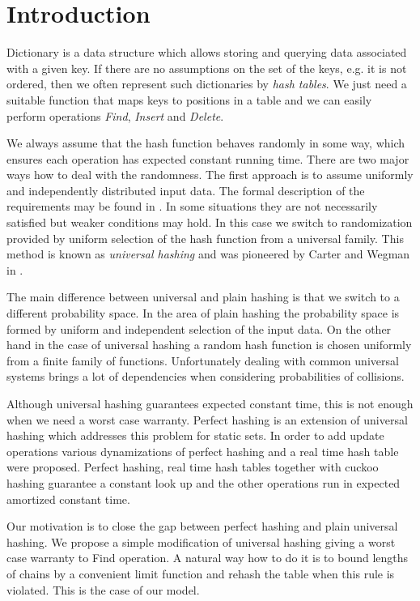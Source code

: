\section{Introduction}
Dictionary is a data structure which allows storing and querying data associated with a given key. If there are no assumptions on the set of the keys, e.g. it is not ordered, then we often represent such dictionaries by \emph{hash tables}. We just need a suitable function that maps keys to positions in a table and we can easily perform operations \emph{Find}, \emph{Insert} and \emph{Delete}. 

We always assume that the hash function behaves randomly in some way, which ensures each operation has expected constant running time. There are two major ways how to deal with the randomness. The first approach is to assume uniformly and independently distributed input data. The formal description of the requirements may be found in \cite{DBLP:books/sp/Mehlhorn84}. In some situations they are not necessarily satisfied but weaker conditions may hold. In this case we switch to randomization provided by uniform selection of the hash function from a universal family. This method is known as \emph{universal hashing} and was pioneered by Carter and Wegman in \cite{DBLP:journals/jcss/CarterW79}. 

The main difference between universal and plain hashing is that we switch to a different probability space. In the area of plain hashing the probability space is formed by uniform and independent selection of the input data. On the other hand in the case of universal hashing a random hash function is chosen uniformly from a finite family of functions. Unfortunately dealing with common universal systems brings a lot of dependencies when considering probabilities of collisions.

Although universal hashing guarantees expected constant time, this is not enough when we need a worst case warranty. Perfect hashing \cite{Fredman:1984:SST:828.1884} is an extension of universal hashing which addresses this problem for static sets. In order to add update operations various dynamizations of perfect hashing \cite{DBLP:journals/siamcomp/DietzfelbingerKMHRT94} and a real time hash table \cite{DBLP:conf/icalp/DietzfelbingerH90} were proposed. Perfect hashing, real time hash tables together with cuckoo hashing \cite{DBLP:conf/esa/PaghR01} guarantee a constant look up and the other operations run in expected amortized constant time.

Our motivation is to close the gap between perfect hashing and plain universal hashing. We propose a simple modification of universal hashing giving a worst case warranty to Find operation. A natural way how to do it is to bound lengths of chains by a convenient limit function and rehash the table when this rule is violated. This is the case of our model.

